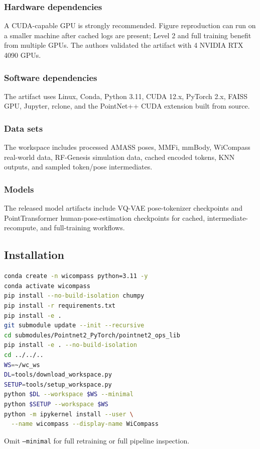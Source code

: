 \documentclass{sigplanconf}
\begin{document}
\subsubsection{Hardware dependencies}
A CUDA-capable GPU is strongly recommended. Figure reproduction can run on a smaller machine after cached logs are present; Level 2 and full training benefit from multiple GPUs. The authors validated the artifact with 4 NVIDIA RTX 4090 GPUs.

\subsubsection{Software dependencies}
The artifact uses Linux, Conda, Python 3.11, CUDA 12.x, PyTorch 2.x, FAISS GPU, Jupyter, rclone, and the PointNet++ CUDA extension built from source.

\subsubsection{Data sets}
The workspace includes processed AMASS poses, MMFi, mmBody, WiCompass real-world data, RF-Genesis simulation data, cached encoded tokens, KNN outputs, and sampled token/pose intermediates.

\subsubsection{Models}
The released model artifacts include VQ-VAE pose-tokenizer checkpoints and PointTransformer human-pose-estimation checkpoints for cached, intermediate-recompute, and full-training workflows.

\subsection{Installation}
\begin{lstlisting}[language=bash]
conda create -n wicompass python=3.11 -y
conda activate wicompass
pip install --no-build-isolation chumpy
pip install -r requirements.txt
pip install -e .
git submodule update --init --recursive
cd submodules/Pointnet2_PyTorch/pointnet2_ops_lib
pip install -e . --no-build-isolation
cd ../../..
WS=~/wc_ws
DL=tools/download_workspace.py
SETUP=tools/setup_workspace.py
python $DL --workspace $WS --minimal
python $SETUP --workspace $WS
python -m ipykernel install --user \
  --name wicompass --display-name WiCompass
\end{lstlisting}
Omit \texttt{--minimal} for full retraining or full pipeline inspection.
\end{document}
